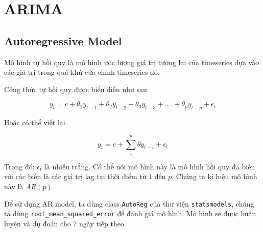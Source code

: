 \documentclass[
]{book}
\begin{document}
\hypertarget{arima}{%
\chapter{ARIMA}\label{arima}}

\hypertarget{autoregressive-model}{%
\section{Autoregressive Model}\label{autoregressive-model}}

Mô hình tự hồi quy là mô hình ước lượng giá trị tương lai của timeseries dựa vào các giá trị trong quá khứ cửa chính timeseries đó.

Công thức tự hồi quy được biểu diễn như sau

\[
y_t = c + \theta_1 y_{t-1} + \theta_2 y_{t-2} + \theta_3 y_{t-3} + .... + \theta_p y_{t-p} + \epsilon_t
\]

Hoặc có thể viết lại

\[
y_t = c + \sum^{p}_{1}\theta y_{t-i} + \epsilon_t
\]

Trong đó: \(\epsilon_t\) là nhiễu trắng. Có thể nói mô hình này là mô hình hồi quy đa biến với các biến là các giá trị lag tại thời điểm từ \(1\) đến \(p\). Chúng ta kí hiệu mô hình này là \(AR(p)\)

Để sử dụng AR model, ta dùng class \texttt{AutoReg} của thư viện \texttt{statsmodels}, chúng ta dùng \texttt{root\_mean\_squared\_error} để đánh giá mô hình. Mô hình sẽ được huấn luyện và dự đoán cho 7 ngày tiếp theo
\end{document}
